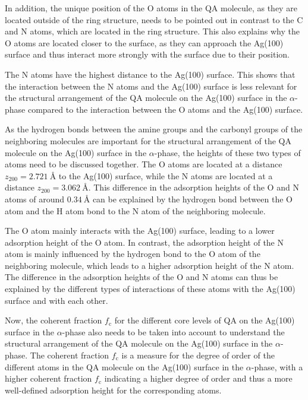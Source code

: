 In addition, the unique position of the O atoms in the \ac{QA} molecule, as they are located outside of the ring structure, needs to be pointed out in contrast to the C and N atoms, which are located in the ring structure. This also explains why the O atoms are located closer to the surface, as they can approach the Ag(100) surface and thus interact more strongly with the surface due to their position.

The N atoms have the highest distance to the Ag(100) surface. This shows that the interaction between the N atoms and the Ag(100) surface is less relevant for the structural arrangement of the \ac{QA} molecule on the Ag(100) surface in the $\alpha$-phase compared to the interaction between the O atoms and the Ag(100) surface. 
 
As the hydrogen bonds between the amine groups and the carbonyl groups of the neighboring molecules are important for the structural arrangement of the \ac{QA} molecule on the Ag(100) surface in the $\alpha$-phase, the heights of these two types of atoms need to be discussed together. The O atoms are located at a distance $z_{200}=2.721~\si{\angstrom}$ to the Ag(100) surface, while the N atoms are located at a distance $z_{200}=3.062~\si{\angstrom}$. This difference in the adsorption heights of the O and N atoms of around $0.34~\si{\angstrom}$ can be explained by the hydrogen bond between the O atom and the H atom bond to the N atom of the neighboring molecule.

The O atom mainly interacts with the Ag(100) surface, leading to a lower adsorption height of the O atom. In contrast, the adsorption height of the N atom is mainly influenced by the hydrogen bond to the O atom of the neighboring molecule, which leads to a higher adsorption height of the N atom. The difference in the adsorption heights of the O and N atoms can thus be explained by the different types of interactions of these atoms with the Ag(100) surface and with each other.

Now, the coherent fraction $f_\mathrm{c}$ for the different core levels of \ac{QA} on the Ag(100) surface in the $\alpha$-phase also needs to be taken into account to understand the structural arrangement of the \ac{QA} molecule on the Ag(100) surface in the $\alpha$-phase. The coherent fraction $f_\mathrm{c}$ is a measure for the degree of order of the different atoms in the \ac{QA} molecule on the Ag(100) surface in the $\alpha$-phase, with a higher coherent fraction $f_\mathrm{c}$ indicating a higher degree of order and thus a more well-defined adsorption height for the corresponding atoms.

